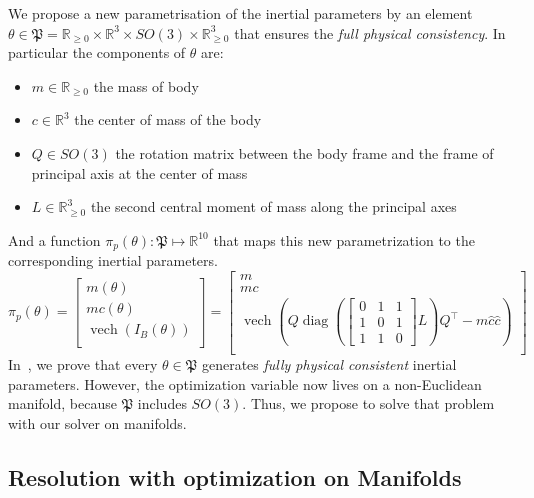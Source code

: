 We propose a new parametrisation of the inertial parameters by an element $\theta \in \mathfrak{P} = \mathbb{R}_{\ge 0} \times \mathbb{R}^3 \times  SO(3) \times \mathbb{R}_{\ge 0}^3$ that ensures the \emph{full physical consistency}. In particular the components of $\theta$ are:
\begin{itemize}
    \item $m \in \mathbb{R}_{\ge 0}$ the mass of body
    \item $c \in \mathbb{R}^3$ the center of mass of the body
    \item $Q \in SO(3)$ the rotation matrix between the body frame and the frame of principal axis at the center of mass
    \item $L \in \mathbb{R}_{\ge 0}^3$ the second central moment of mass along the principal axes
\end{itemize}
And a function $\pi_p(\theta):\mathfrak{P}\mapsto\mathbb{R}^{10}$ that maps this new parametrization to the corresponding inertial parameters.
\begin{equation}
  \label{eq:pip}
  \pi_p(\theta)
  =
  \begin{bmatrix}
    m(\theta) \\
    mc(\theta) \\
    \operatorname{vech}\left(I_B(\theta)\right) \\
  \end{bmatrix}
  =
  \begin{bmatrix}
    m \\
    mc \\
    \operatorname{vech}\left( Q \operatorname{diag}{(\left[\begin{smallmatrix}
    0 & 1 & 1 \\
    1 & 0 & 1 \\
    1 & 1 & 0
    \end{smallmatrix}\right] L)}  Q^\top - m \hat{c} \hat{c} \right) \\
  \end{bmatrix} \nonumber
\end{equation}
In~\cite{traversaro:iros:2016}, we prove that every $\theta\in\mathfrak{P}$ generates \emph{fully physical consistent} inertial parameters.
However, the optimization variable now lives on a non-Euclidean manifold, because $\mathfrak{P}$ includes $SO(3)$.
Thus, we propose to solve that problem with our solver on manifolds.

\subsection{Resolution with optimization on Manifolds}
\label{sub:resolution_with_optimization_on_manifolds}

